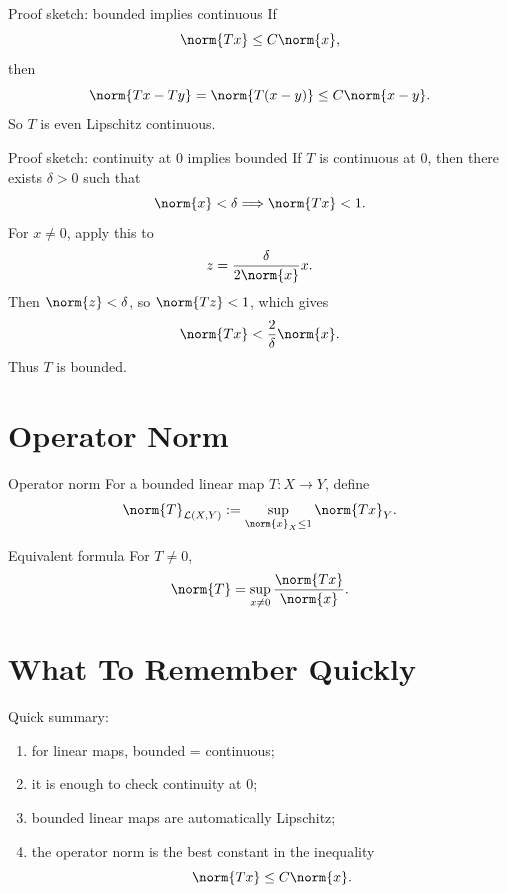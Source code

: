 \documentclass[header={Ancillary Note: Bounded vs Continuous},notheorems]{study-note}
\begin{document}
\begin{exbox}{Proof sketch: bounded implies continuous}
If
\[
\norm{Tx}\le C\norm{x},
\]
then
\[
\norm{Tx-Ty}=\norm{T(x-y)}\le C\norm{x-y}.
\]
So $T$ is even Lipschitz continuous.
\end{exbox}

\begin{exbox}{Proof sketch: continuity at $0$ implies bounded}
If $T$ is continuous at $0$, then there exists $\delta>0$ such that
\[
\norm{x}<\delta \Longrightarrow \norm{Tx}<1.
\]
For $x\neq 0$, apply this to
\[
z=\frac{\delta}{2\norm{x}}x.
\]
Then $\norm{z}<\delta$, so $\norm{Tz}<1$, which gives
\[
\norm{Tx}<\frac{2}{\delta}\norm{x}.
\]
Thus $T$ is bounded.
\end{exbox}

\section{Operator Norm}

\begin{defbox}{Operator norm}
For a bounded linear map $T:X\to Y$, define
\[
\norm{T}_{\mathcal L(X,Y)}:=\sup_{\norm{x}_X\le 1}\norm{Tx}_Y.
\]
\end{defbox}

\begin{thmbox}{Equivalent formula}
For $T\neq 0$,
\[
\norm{T}=\sup_{x\neq 0}\frac{\norm{Tx}}{\norm{x}}.
\]
\end{thmbox}

\section{What To Remember Quickly}

\begin{focusbox}
Quick summary:
\begin{enumerate}
\item for linear maps, bounded = continuous;
\item it is enough to check continuity at $0$;
\item bounded linear maps are automatically Lipschitz;
\item the operator norm is the best constant in the inequality
\[
\norm{Tx}\le C\norm{x}.
\]
\end{enumerate}
\end{focusbox}
\end{document}
